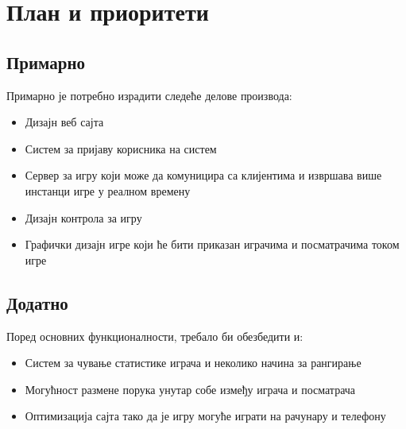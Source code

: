 \section{План и приоритети}

\subsection{Примарно}
Примарно је потребно израдити следеће делове производа:
\begin{itemize}

\item Дизајн веб сајта

\item Систем за пријаву корисника на систем

\item Сервер за игру који може да комуницира са клијентима и извршава више инстанци игре у реалном времену

\item Дизајн контрола за игру

\item Графички дизајн игре који ће бити приказан играчима и посматрачима током игре

\end{itemize}

\subsection{Додатно}
Поред основних функционалности, требало би обезбедити и:
\begin{itemize}
    
    \item Систем за чување статистике играча и неколико начина за рангирање

    \item Могућност размене порука унутар собе између играча и посматрача

\item Оптимизација сајта тако да је игру могуће играти на рачунару и телефону    
\end{itemize}
